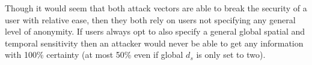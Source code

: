 Though it would seem that both attack vectors are able to break the security of a user with relative ease, then they both rely on users not specifying any general level of anonymity. If users always opt to also specify a general global spatial and temporal sensitivity then an attacker would never be able to get any information with 100\% certainty (at most 50\% even if global $d_s$ is only set to two).
